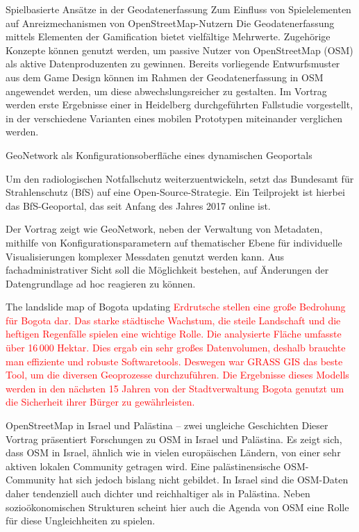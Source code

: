 %
{Spielbasierte Ansätze in der Geodatenerfassung}%
{Zum Einfluss von Spielelementen auf Anreizmechanismen von OpenStreetMap-Nutzern}%
{%
Die Geodatenerfassung mittels Elementen der Gamification bietet vielfältige
Mehrwerte. Zugehörige Konzepte können genutzt werden, um passive Nutzer von
OpenStreetMap (OSM) als aktive Datenproduzenten zu gewinnen. Bereits
vorliegende Entwurfsmuster aus dem Game Design können im Rahmen der
Geodatenerfassung in OSM angewendet werden, um diese abwechslungsreicher zu
gestalten. Im Vortrag werden erste Ergebnisse einer in Heidelberg
durchgeführten Fallstudie vorgestellt, in der verschiedene Varianten eines
mobilen Prototypen miteinander verglichen werden.%
}

%
{GeoNetwork als Konfigurationsoberfläche eines dynamischen Geoportals}%
{}%
{%
Um den radiologischen Notfallschutz weiterzuentwickeln, setzt das Bundesamt für
Strahlenschutz (BfS) auf eine Open-Source-Strategie. Ein Teilprojekt ist
hierbei das BfS-Geoportal, das seit Anfang des Jahres 2017 online ist.

Der Vortrag zeigt wie GeoNetwork, neben der Verwaltung von Metadaten, mithilfe
von Konfigurationsparametern auf thematischer Ebene für individuelle
Visualisierungen komplexer Messdaten genutzt werden kann. Aus
fachadministrativer Sicht soll die Möglichkeit bestehen, auf Änderungen der
Datengrundlage ad hoc reagieren zu können.%
}

%
{The landslide map of Bogota updating}%
{}%
{%
  \textcolor{red}{Erdrutsche stellen eine große Bedrohung für Bogota dar. Das starke städtische
    Wachstum, die steile Landschaft und die heftigen Regenfälle spielen eine
    wichtige Rolle. Die analysierte Fläche umfasste über 16\,000 Hektar. Dies ergab
    ein sehr großes Datenvolumen, deshalb brauchte man effiziente und robuste
    Softwaretools. Deswegen war GRASS GIS das beste Tool, um die diversen
    Geoprozesse durchzuführen. Die Ergebnisse dieses Modells werden in den nächsten
    15 Jahren von der Stadtverwaltung Bogota genutzt um die Sicherheit ihrer Bürger
    zu gewährleisten.%
  }%
}

%
{OpenStreetMap in Israel und Palästina -- zwei ungleiche Geschichten}%
{}%
{%
Dieser Vortrag präsentiert Forschungen zu OSM in Israel und Palästina. Es zeigt
sich, dass OSM in Israel, ähnlich wie in vielen europäischen Ländern, von einer
sehr aktiven lokalen Community getragen wird. Eine palästinensische
OSM-Community hat sich jedoch bislang nicht gebildet. In Israel sind die
OSM-Daten daher tendenziell auch dichter und reichhaltiger als in Palästina.
Neben sozioökonomischen Strukturen scheint hier auch die Agenda von OSM eine
Rolle für diese Ungleichheiten zu spielen.%
}


